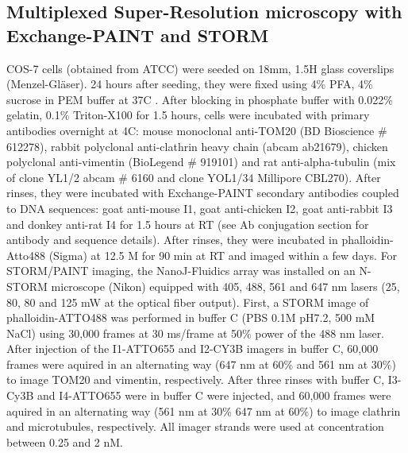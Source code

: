 \subsection*{Multiplexed Super-Resolution microscopy with Exchange-PAINT and STORM}
COS-7 cells (obtained from ATCC) were seeded on 18mm, 1.5H glass coverslips (Menzel-Gläser). 24 hours after seeding, they were fixed using 4\% PFA, 4\% sucrose in PEM buffer at 37\degree C \cite{leyton2016pfa}. After blocking in phosphate buffer with 0.022\% gelatin, 0.1\% Triton-X100 for 1.5 hours, cells were incubated with primary antibodies overnight at 4\degree C: mouse monoclonal anti-TOM20 (BD Bioscience \# 612278), rabbit polyclonal anti-clathrin heavy chain (abcam ab21679), chicken polyclonal anti-vimentin (BioLegend \# 919101) and rat anti-alpha-tubulin (mix of clone YL1/2 abcam \# 6160 and clone YOL1/34 Millipore CBL270). After rinses, they were incubated with Exchange-PAINT secondary antibodies coupled to DNA sequences: goat anti-mouse I1, goat anti-chicken I2, goat anti-rabbit I3 and donkey anti-rat I4 for 1.5 hours at RT (see Ab conjugation section for antibody and sequence details). After rinses, they were incubated in phalloidin-Atto488 (Sigma) at 12.5 \textmu{}M for 90 min at RT and imaged within a few days.
For STORM/PAINT imaging, the NanoJ-Fluidics array was installed on an N-STORM microscope (Nikon) equipped with 405, 488, 561 and 647 nm lasers (25, 80, 80 and 125 mW at the optical fiber output). First, a STORM image of phalloidin-ATTO488 was performed in buffer C (PBS 0.1M pH7.2, 500 mM NaCl) using 30,000 frames at 30 ms/frame at 50\% power of the 488 nm laser. After injection of the I1-ATTO655 and I2-CY3B imagers in buffer C, 60,000 frames were aquired in an alternating way (647 nm at 60\% and 561 nm at 30\%) to image TOM20 and vimentin, respectively. After three rinses with buffer C, I3-Cy3B and I4-ATTO655 were in buffer C were injected, and 60,000 frames were aquired in an alternating way (561 nm at 30\% 647 nm at 60\%) to image clathrin and microtubules, respectively. All imager strands were used at concentration between 0.25 and 2 nM. 

